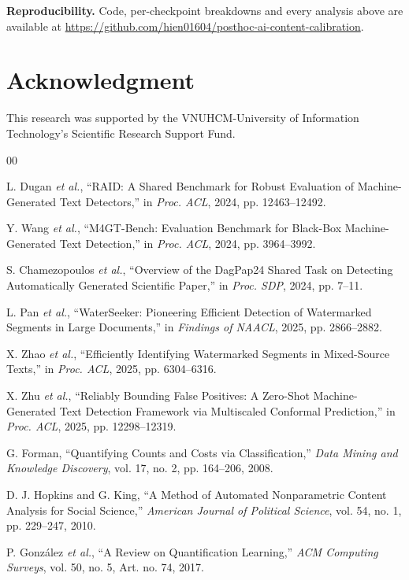 \documentclass[10pt,conference,a4paper]{IEEEtran}
\begin{document}
\noindent\textbf{Reproducibility.} Code, per-checkpoint breakdowns and every analysis
above are available at \url{https://github.com/hien01604/posthoc-ai-content-calibration}.

\section*{Acknowledgment}

This research was supported by the VNUHCM-University of Information Technology's Scientific Research Support Fund.

\begin{thebibliography}{00}

L. Dugan \textit{et al.}, ``RAID: A Shared Benchmark for Robust Evaluation of Machine-Generated
Text Detectors,'' in \textit{Proc. ACL}, 2024, pp. 12463--12492.

Y. Wang \textit{et al.}, ``M4GT-Bench: Evaluation Benchmark for Black-Box Machine-Generated
Text Detection,'' in \textit{Proc. ACL}, 2024, pp. 3964--3992.

S. Chamezopoulos \textit{et al.}, ``Overview of the DagPap24 Shared Task on Detecting
Automatically Generated Scientific Paper,'' in \textit{Proc. SDP}, 2024, pp. 7--11.

L. Pan \textit{et al.}, ``WaterSeeker: Pioneering Efficient Detection of Watermarked
Segments in Large Documents,'' in \textit{Findings of NAACL}, 2025, pp. 2866--2882.

X. Zhao \textit{et al.}, ``Efficiently Identifying Watermarked Segments in Mixed-Source
Texts,'' in \textit{Proc. ACL}, 2025, pp. 6304--6316.

X. Zhu \textit{et al.}, ``Reliably Bounding False Positives: A Zero-Shot
Machine-Generated Text Detection Framework via Multiscaled Conformal Prediction,'' in
\textit{Proc. ACL}, 2025, pp. 12298--12319.

G. Forman, ``Quantifying Counts and Costs via Classification,'' \textit{Data Mining and
Knowledge Discovery}, vol. 17, no. 2, pp. 164--206, 2008.

D. J. Hopkins and G. King, ``A Method of Automated Nonparametric Content Analysis for
Social Science,'' \textit{American Journal of Political Science}, vol. 54, no. 1,
pp. 229--247, 2010.

P. Gonz\'alez \textit{et al.}, ``A Review on Quantification Learning,'' \textit{ACM
Computing Surveys}, vol. 50, no. 5, Art. no. 74, 2017.


\end{thebibliography}
\end{document}
